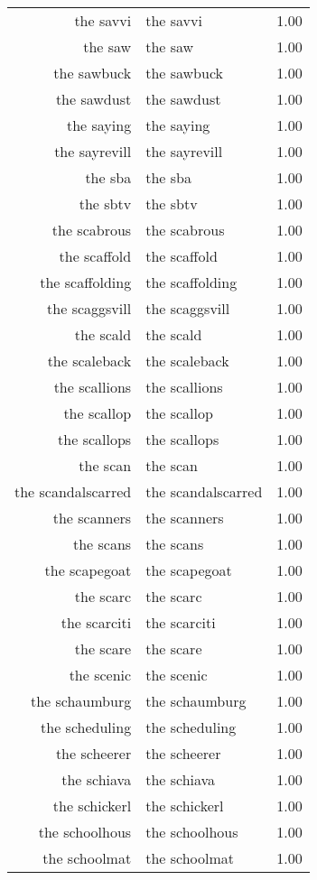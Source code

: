 \begin{table}[ht]
\begin{tabular}{rlr}
  the savvi & the savvi & 1.00 \\ 
  the saw & the saw & 1.00 \\ 
  the sawbuck & the sawbuck & 1.00 \\ 
  the sawdust & the sawdust & 1.00 \\ 
  the saying & the saying & 1.00 \\ 
  the sayrevill & the sayrevill & 1.00 \\ 
  the sba & the sba & 1.00 \\ 
  the sbtv & the sbtv & 1.00 \\ 
  the scabrous & the scabrous & 1.00 \\ 
  the scaffold & the scaffold & 1.00 \\ 
  the scaffolding & the scaffolding & 1.00 \\ 
  the scaggsvill & the scaggsvill & 1.00 \\ 
  the scald & the scald & 1.00 \\ 
  the scaleback & the scaleback & 1.00 \\ 
  the scallions & the scallions & 1.00 \\ 
  the scallop & the scallop & 1.00 \\ 
  the scallops & the scallops & 1.00 \\ 
  the scan & the scan & 1.00 \\ 
  the scandalscarred & the scandalscarred & 1.00 \\ 
  the scanners & the scanners & 1.00 \\ 
  the scans & the scans & 1.00 \\ 
  the scapegoat & the scapegoat & 1.00 \\ 
  the scarc & the scarc & 1.00 \\ 
  the scarciti & the scarciti & 1.00 \\ 
  the scare & the scare & 1.00 \\ 
  the scenic & the scenic & 1.00 \\ 
  the schaumburg & the schaumburg & 1.00 \\ 
  the scheduling & the scheduling & 1.00 \\ 
  the scheerer & the scheerer & 1.00 \\ 
  the schiava & the schiava & 1.00 \\ 
  the schickerl & the schickerl & 1.00 \\ 
  the schoolhous & the schoolhous & 1.00 \\ 
  the schoolmat & the schoolmat & 1.00 \\ 

\end{tabular}
\end{table}
